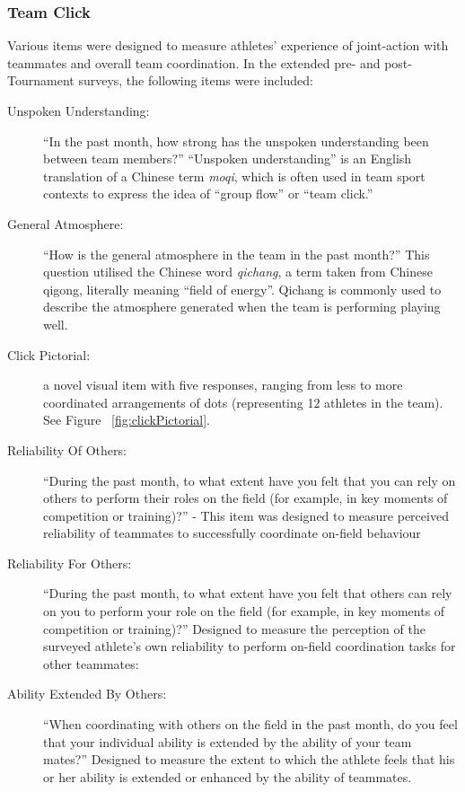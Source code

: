 \subsubsection{Team Click}
Various items were designed to measure athletes' experience of joint-action with teammates and overall team coordination. In the extended pre- and post-Tournament surveys, the following items were included:
\begin{description}
  \item [Unspoken Understanding:] ``In the past month, how strong has the unspoken understanding been between team members?''  ``Unspoken understanding'' is an English translation of a Chinese term \textit{moqi}, which is often used in team sport contexts to express the idea of  ``group flow'' or ``team click.''
    \item [General Atmosphere:] ``How is the general atmosphere in the team in the past month?'' This question utilised the Chinese word \textit{qichang}, a term taken from Chinese qigong, literally meaning ``field of energy''. Qichang is commonly used to describe the atmosphere generated when the team is performing playing well.
  \item [Click Pictorial:] a novel visual item with five responses, ranging from less to more coordinated arrangements of dots (representing 12 athletes in the team). See Figure ~\ref{fig:clickPictorial}.
  \item [Reliability Of Others:] ``During the past month, to what extent have you felt that you can rely on others to perform their roles on the field (for example, in key moments of competition or training)?'' - This item was designed to measure perceived reliability of teammates to successfully coordinate  on-field behaviour
  \item [Reliability For Others:] ``During the past month, to what extent have you felt that others can rely on you to perform your role on the field (for example, in key moments of competition or training)?'' Designed to measure the perception of the surveyed athlete's own reliability to perform on-field coordination tasks for other teammates:
  \item[Ability Extended By Others:] ``When coordinating with others on the field in the past month, do you feel that your individual ability is extended by the ability of your team mates?'' Designed to measure the extent to which the athlete feels that his or her ability is extended or enhanced by the ability of teammates.
\end{description}


